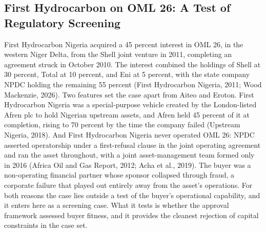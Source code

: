 \documentclass[twoside,fontset=lmodern]{mitthesis}
\begin{document}
\hypertarget{first-hydrocarbon-on-oml-26-a-test-of-regulatory-screening}{%
\subsection{First Hydrocarbon on OML 26: A Test of Regulatory
Screening}\label{first-hydrocarbon-on-oml-26-a-test-of-regulatory-screening}}

First Hydrocarbon Nigeria acquired a 45 percent interest in OML 26, in
the western Niger Delta, from the Shell joint venture in 2011,
completing an agreement struck in October 2010. The interest combined
the holdings of Shell at 30 percent, Total at 10 percent, and Eni at 5
percent, with the state company NPDC holding the remaining 55 percent
(First Hydrocarbon Nigeria, 2011; Wood Mackenzie, 2026). Two features
set the case apart from Aiteo and Eroton. First Hydrocarbon Nigeria was
a special-purpose vehicle created by the London-listed Afren plc to hold
Nigerian upstream assets, and Afren held 45 percent of it at completion,
rising to 70 percent by the time the company failed (Upstream Nigeria,
2018). And First Hydrocarbon Nigeria never operated OML 26: NPDC
asserted operatorship under a first-refusal clause in the joint
operating agreement and ran the asset throughout, with a joint
asset-management team formed only in 2016 (Africa Oil and Gas Report,
2012; Acha et al., 2019). The buyer was a non-operating financial
partner whose sponsor collapsed through fraud, a corporate failure that
played out entirely away from the asset's operations. For both reasons
the case lies outside a test of the buyer's operational capability, and
it enters here as a screening case. What it tests is whether the
approval framework assessed buyer fitness, and it provides the cleanest
rejection of capital constraints in the case set.
\end{document}
